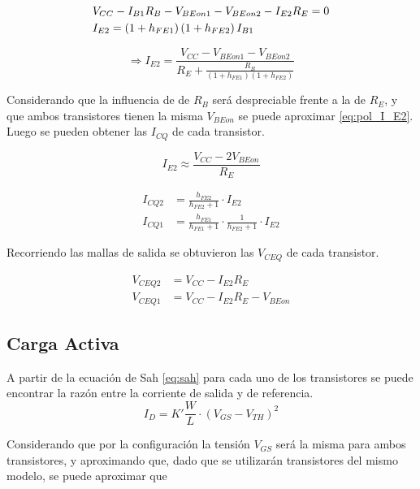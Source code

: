 \begin{align*}
    & V_{CC}-I_{B1}R_{B}-V_{BEon1}-V_{BEon2}-I_{E2}R_{E}=0 \\
    \vspace{1mm}
    & I_{E2} = \left(1 + h_{FE1}\right)\left(1 + h_{FE2}\right) I_{B1} 
\end{align*}

\begin{equation}
    \Rightarrow I_{E2} = \frac{V_{CC}-V_{BEon1}-V_{BEon2}}{R_E+\frac{R_B}{\left(1 + h_{FE1}\right)\left(1 + h_{FE2}\right)}}
    \label{I_E}
\end{equation}

Considerando que la influencia de de $R_B$ será despreciable frente a la de $R_E$, y que ambos transistores
 tienen la misma $V_{BEon}$ se puede aproximar \eqref{eq:pol_I_E2}. Luego se pueden obtener las $I_{CQ}$ de cada transistor.

\begin{equation}
    I_{E2} \approx \frac{V_{CC}-2V_{BEon}}{R_E}
    \label{eq:pol_I_E2}
\end{equation}

\begin{align}
    I_{CQ2} &= \frac{h_{FE2}}{h_{FE2}+1}\cdot I_{E2} \label{eq:icq2} \\ 
    I_{CQ1} &= \frac{h_{FE1}}{h_{FE1}+1}\cdot \frac{1}{h_{FE2}+1}\cdot I_{E2} \label{eq:icq1}
\end{align}

Recorriendo las mallas de salida se obtuvieron las $V_{CEQ}$ de cada transistor.

\begin{align}
    V_{CEQ2} &= V_{CC} - I_{E2} R_E \\
    V_{CEQ1} &= V_{CC} - I_{E2} R_E - V_{BEon} 
\end{align}

\subsection{Carga Activa}

A partir de la ecuación de Sah \eqref{eq:sah} para cada uno de los transistores se puede encontrar la razón entre la corriente de salida y de referencia.
\begin{equation}
    I_D = K' \frac{W}{L}\cdot (V_{GS}-V_{TH})^2
    \label{eq:sah}
\end{equation}

Considerando que por la configuración la tensión $V_{GS}$ será la misma para ambos transistores, y aproximando que, dado que se utilizarán transistores del mismo modelo, se puede aproximar que 

